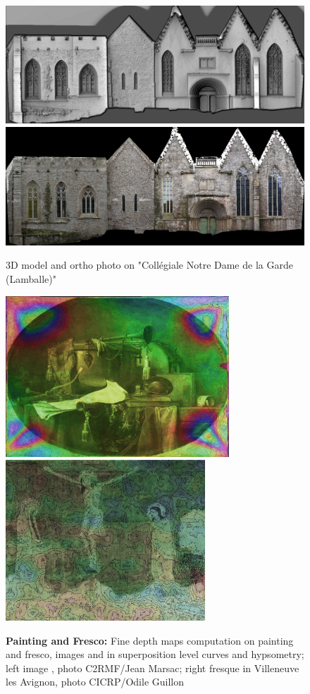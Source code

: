 \begin{figure}
\includegraphics[width=150mm]{FIGS/SAMPLES/LambaleShade.jpg}
\includegraphics[width=150mm]{FIGS/SAMPLES/Lamballe-Ortho-Test-Redr.jpg}
\caption{3D model and ortho photo on "Collégiale Notre Dame de la Garde (Lamballe)"}
\end{figure}




\begin{figure}
\includegraphics[width=84mm]{FIGS/SAMPLES/Louvre-Superp.jpg}
\includegraphics[width=75mm]{FIGS/SAMPLES/FresqVilAv.jpg}
\caption{{\bf Painting and Fresco: } Fine depth maps computation on painting and fresco,
images and in superposition level curves and hypsometry;
left image  , photo C2RMF/Jean Marsac; right fresque in Villeneuve
les Avignon, photo CICRP/Odile Guillon}
\end{figure}



